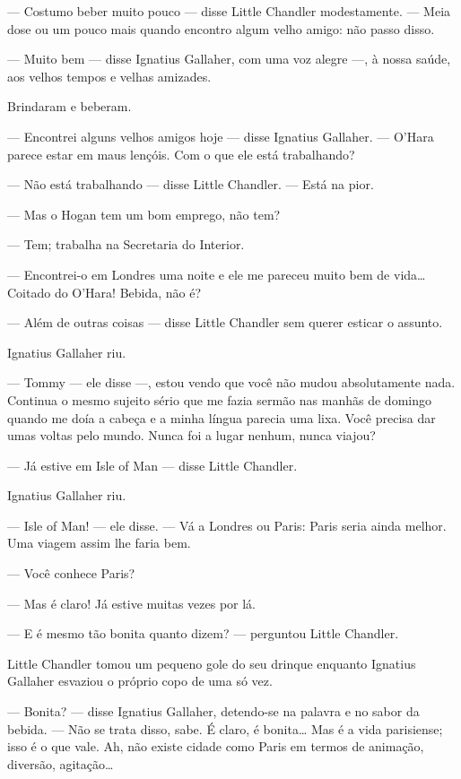 --- Costumo beber muito pouco --- disse Little Chandler modestamente.  --- Meia
dose ou um pouco mais quando encontro algum velho amigo: não passo disso.

--- Muito bem --- disse Ignatius Gallaher, com uma voz alegre ---, à nossa
saúde, aos velhos tempos e velhas amizades.

Brindaram e beberam.

--- Encontrei alguns velhos amigos hoje --- disse Ignatius Gallaher.  ---
O’Hara parece estar em maus lençóis.  Com o que ele está trabalhando?

--- Não está trabalhando --- disse Little Chandler.  --- Está na pior.

--- Mas o Hogan tem um bom emprego, não tem?

--- Tem; trabalha na Secretaria do Interior.

--- Encontrei-o em Londres uma noite e ele me pareceu muito bem de vida\ldots{}
Coitado do O’Hara!  Bebida, não é?

--- Além de outras coisas --- disse Little Chandler sem querer esticar o
assunto.

Ignatius Gallaher riu.

--- Tommy --- ele disse ---, estou vendo que você não mudou absolutamente nada.
Continua o mesmo sujeito sério que me fazia sermão nas manhãs de domingo quando
me doía a cabeça e a minha língua parecia uma lixa.  Você precisa dar umas
voltas pelo mundo.  Nunca foi a lugar nenhum, nunca viajou?

--- Já estive em Isle of Man --- disse Little Chandler.

Ignatius Gallaher riu.

--- Isle of Man! --- ele disse.  --- Vá a Londres ou Paris: Paris seria ainda
melhor.  Uma viagem assim lhe faria bem.

--- Você conhece Paris?

--- Mas é claro!  Já estive muitas vezes por lá.

--- E é mesmo tão bonita quanto dizem? --- perguntou Little Chandler.

Little Chandler tomou um pequeno gole do seu drinque enquanto Ignatius Gallaher
esvaziou o próprio copo de uma só vez.

--- Bonita? --- disse Ignatius Gallaher, detendo-se na palavra e no sabor da
bebida.  --- Não se trata disso, sabe.  É claro, é bonita\ldots{}  Mas é a vida
parisiense; isso é o que vale.  Ah, não existe cidade como Paris em termos de
animação, diversão, agitação\ldots{}

